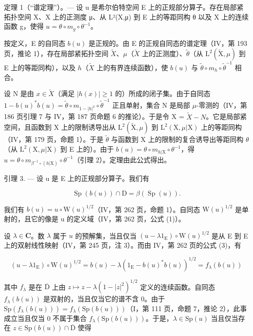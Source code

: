 定理 1（“谱定理”）。--- 设 u 是希尔伯特空间 E 上的正规部分算子。存在局部紧拓扑空间 X、X 上的正测度 μ、从 L²(X,μ) 到 E 上的等距同构 θ 以及 X 上的连续函数 g，使得 \(u = \theta \circ m_g \circ \theta^{-1}\)。

按定义，E 的自同态 \(b(u)\) 是正规的。由 E 的正规自同态的谱定理（IV，第 193 页，推论 1），存在局部紧拓扑空间 \(\widetilde{X}\)、\(\mu\)（\(\widetilde{X}\) 上的正测度）、\(\widetilde{\theta}\)（从 \(\mathrm{L}^2 (\widetilde{\mathrm{X}},\mu)\) 到 E 上的等距同构），以及 \(h\)（\(\widetilde{X}\) 上的有界连续函数），使 \(b(u)\) 与 \(\widetilde{\theta}\circ m_h\circ \widetilde{\theta}^{-1}\) 相合。

设 N 是由 \(x \in \widetilde{X}\)（满足 \(|h(x)| \geqslant 1\) 的）所成的闭子集。由于自同态 \(1 - b(u)^{*}b(u) = \widetilde{\theta} \circ m_{1-|h|^2} \circ \widetilde{\theta}^{-1}\) 正且单射，集合 N 是局部 \(\mu\)-零测的（IV，第 186 页引理 7 与 IV，第 187 页命题 6 的推论）。于是令 X = \(\widetilde{X} - N\)。它是局部紧空间，且函数到 X 上的限制诱导出从 \(\mathrm{L}^{2}(\widetilde{\mathrm{X}}, \mu)\) 到 \(\mathrm{L}^{2}(\mathrm{X}, \mu|\mathrm{X})\) 上的等距同构（IV，第 179 页，命题 1）。于是 \(\widetilde{\theta}\) 与函数到 X 上的限制的复合诱导出等距同构 \(\theta\)（从 \(\mathrm{L}^{2}(\mathrm{X}, \mu|\mathrm{X})\) 到 E 上的）。由于 \(b(u) = \theta \circ m_{h|\mathrm{X}} \circ \theta^{-1}\)，得 \(u = \theta \circ m_{\beta^{-1} \circ (h|\mathrm{X})} \circ \theta^{-1}\)（引理 2）。定理由此公式得出。

引理 3. --- 设 u 是 E 上的正规部分算子。我们有

\[
\operatorname{Sp} (b (u)) \cap \mathrm{D} = \beta (\operatorname{Sp} (u)).
\]

我们有 \(b(u) = u \circ \mathrm{W}(u)^{1/2}\)（IV，第 262 页，命题 1）。自同态 \(\mathrm{W}(u)^{1/2}\) 是单射的，且它的像是 u 的定义域（IV，第 262 页，公式 (1)）。

设 \(\lambda \in \mathbf{C}\)。数 \(\lambda\) 属于 \(u\) 的预解集，当且仅当 \((u - \lambda 1_{\mathrm{E}}) \circ \mathrm{W}(u)^{1/2}\) 是从 E 到 E 上的双射线性映射（IV，第 245 页，注 3）。而由 IV，第 262 页的公式 (3)，有

\[
(u - \lambda 1 _ {\mathrm{E}}) \circ \mathrm{W} (u) ^ {1 / 2} = b (u) - \lambda (1 _ {\mathrm{E}} - b (u) ^ {*} b (u)) ^ {1 / 2} = f _ {\lambda} (b (u))
\]

其中 \(f_{\lambda}\) 是在 \(\overline{\mathrm{D}}\) 上由 \(z \mapsto z - \lambda (1 - |z|^2)^{1/2}\) 定义的连续函数。自同态 \(f_{\lambda}(b(u))\) 是双射的，当且仅当它的谱不含 0。由于 \(\mathrm{Sp}(f_{\lambda}(b(u))) = f_{\lambda}(\mathrm{Sp}(b(u)))\)（I，第 111 页，命题 7，推论 2），此事成立当且仅当 0 不属于集合 \(f_{\lambda}(\mathrm{Sp}(b(u)))\)。于是，\(\lambda \in \mathrm{Sp}(u)\) 当且仅当存在 \(z \in \mathrm{Sp}(b(u)) \cap \overline{\mathrm{D}}\) 使得

